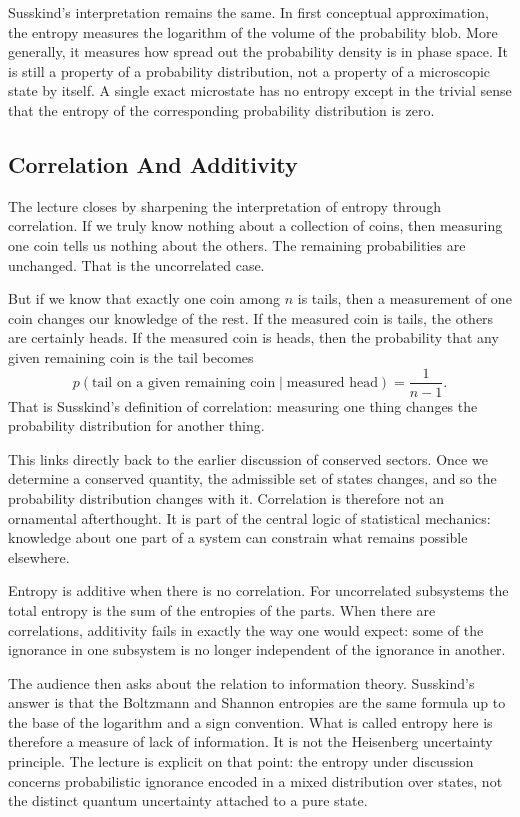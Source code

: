 Susskind's interpretation remains the same. In first conceptual approximation, the entropy measures the logarithm of the volume of the probability blob. More generally, it measures how spread out the probability density is in phase space. It is still a property of a probability distribution, not a property of a microscopic state by itself. A single exact microstate has no entropy except in the trivial sense that the entropy of the corresponding probability distribution is zero.

\subsection{Correlation And Additivity}

The lecture closes by sharpening the interpretation of entropy through correlation. If we truly know nothing about a collection of coins, then measuring one coin tells us nothing about the others. The remaining probabilities are unchanged. That is the uncorrelated case.

But if we know that exactly one coin among \(n\) is tails, then a measurement of one coin changes our knowledge of the rest. If the measured coin is tails, the others are certainly heads. If the measured coin is heads, then the probability that any given remaining coin is the tail becomes
\begin{equation}
p(\text{tail on a given remaining coin}\mid \text{measured head})
=
\frac{1}{n-1}.
\end{equation}
That is Susskind's definition of correlation: measuring one thing changes the probability distribution for another thing.

This links directly back to the earlier discussion of conserved sectors. Once we determine a conserved quantity, the admissible set of states changes, and so the probability distribution changes with it. Correlation is therefore not an ornamental afterthought. It is part of the central logic of statistical mechanics: knowledge about one part of a system can constrain what remains possible elsewhere.

Entropy is additive when there is no correlation. For uncorrelated subsystems the total entropy is the sum of the entropies of the parts. When there are correlations, additivity fails in exactly the way one would expect: some of the ignorance in one subsystem is no longer independent of the ignorance in another.

The audience then asks about the relation to information theory. Susskind's answer is that the Boltzmann and Shannon entropies are the same formula up to the base of the logarithm and a sign convention. What is called entropy here is therefore a measure of lack of information. It is not the Heisenberg uncertainty principle. The lecture is explicit on that point: the entropy under discussion concerns probabilistic ignorance encoded in a mixed distribution over states, not the distinct quantum uncertainty attached to a pure state.

